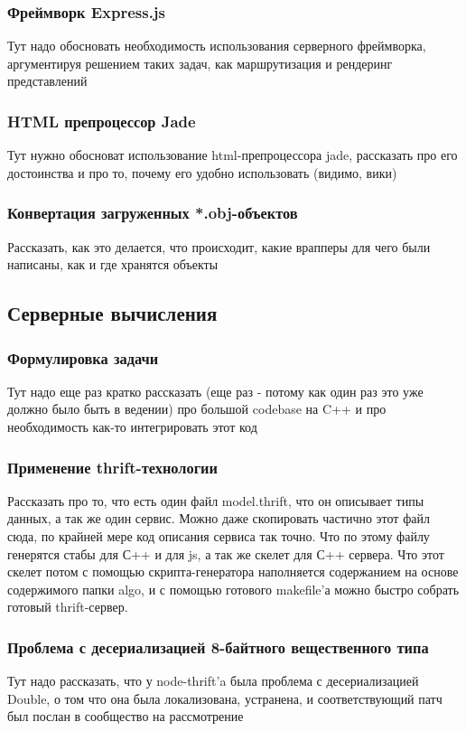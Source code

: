\documentclass[12pt, a4paper]{article}
\begin{document}
\subsubsection{Фреймворк Express.js}
Тут надо обосновать необходимость использования серверного фреймворка,
аргументируя решением таких задач, как маршрутизация и рендеринг представлений
\subsubsection{HTML препроцессор Jade}
Тут нужно обосноват использование html-препроцессора jade, рассказать про его
достоинства и про то, почему его удобно использовать (видимо, вики)
\subsubsection{Конвертация загруженных *.obj-объектов}
Рассказать, как это делается, что происходит, какие врапперы для чего были
написаны, как и где хранятся объекты

\subsection{Серверные вычисления}
\subsubsection{Формулировка задачи}
Тут надо еще раз кратко рассказать (еще раз - потому как один раз это уже должно было
быть в ведении) про большой codebase на C++ и про необходимость как-то
интегрировать этот код
\subsubsection{Применение thrift-технологии}
Рассказать про то, что есть один файл model.thrift, что он описывает типы
данных, а так же один сервис. Можно даже скопировать частично этот файл сюда, по
крайней мере код описания сервиса так точно. Что по этому файлу генерятся стабы
для С++ и для js, а так же скелет для С++ сервера. Что этот скелет потом
с помощью скрипта-генератора наполняется содержанием на основе содержимого папки
algo, и с помощью готового makefile'а можно быстро собрать готовый
thrift-сервер.
\subsubsection{Проблема с десериализацией 8-байтного вещественного типа}
Тут надо рассказать, что у node-thrift'a была проблема с десериализацией Double,
о том что она была локализована, устранена, и соответствующий патч был послан в
сообщество на рассмотрение
\end{document}
